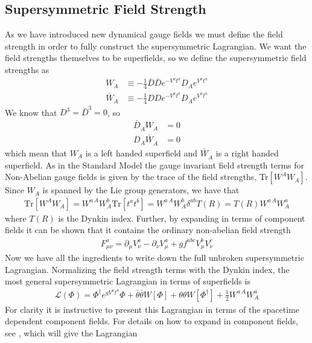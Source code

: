 \subsection{Supersymmetric Field Strength}
As we have introduced new dynamical gauge fields we must define the field strength in order to fully construct the supersymmetric Lagrangian. We want the field strengths themselves to be superfields, so we define the supersymmetric field strengths as
\begin{align}
    W_{A}&\equiv -\frac{1}{4}\bar{D}\bar{D}e^{-V^{a}t^{a}}D_{A}e^{V^{a}t^{a}}
    \\
    \bar{W}_{\dot{A}}&\equiv-\frac{1}{4}DDe^{-V^{a}t^{a}}D_{\dot{A}}e^{V^{a}t^{a}}
\end{align}
We know that $D^{3}=\bar{D}^{3}=0$, so
\begin{align}
    \bar{D}_{\dot{A}}W_{A}&=0
    \\
    D_{A}\bar{W}_{\dot{A}}&=0
\end{align}
which mean that $W_{A}$ is a left handed superfield and $\bar{W}_{\dot{A}}$ is a right handed superfield. As in the Standard Model the gauge invariant field strength terms for Non-Abelian gauge fields is given by the trace of the field strengths, Tr$[W^{A}W_{A}]$. Since $W_{A}$ is spanned by the Lie group generators, we have that
\begin{align}
    \text{Tr}[W^{A}W_{A}]=W^{a\,A}W_{A}^{b}\text{Tr}[t^{a}t^{b}]=W^{a\,A}W_{A}^{b}\delta^{ab}T(R)=T(R)W^{a\,A}W_{A}^{a}
\end{align}
where $T(R)$ is the Dynkin index. Further, by expanding in terms of component fields it can be shown that it contains the ordinary non-abelian field strength
\begin{align}
    F_{\mu\nu}^{a}=\partial_{\mu}V_{\nu}^{a}-\partial_{\nu}V_{\mu}^{a}+gf^{abc}V_{\mu}^{b}V_{\nu}^{c}
\end{align}
Now we have all the ingredients to write down the full unbroken supersymmetric Lagrangian. Normalizing the field strength terms with the Dynkin index, the most general supersymmetric Lagrangian in terms of superfields is
\begin{align}\label{eq:superlagrangian}
    \mathcal{L}(\Phi)=\Phi^{\dagger}e^{gV^{a}t^{a}}\Phi+\bar{\theta}\bar{\theta}W[\Phi]+\theta\theta W[\Phi^{\dagger}]+\frac{1}{2}W^{a\,A}W_{A}^{a}
\end{align}
For clarity it is instructive to present this Lagrangian in terms of the spacetime dependent component fields. For details on how to expand in component fields, see \cite{Martin:1997ns}, which will give the Lagrangian
